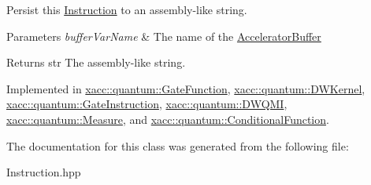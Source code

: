 Persist this \hyperlink{a01155}{Instruction} to an assembly-\/like string.


\begin{DoxyParams}{Parameters}
{\em buffer\+Var\+Name} & The name of the \hyperlink{a01123}{Accelerator\+Buffer} \\
\hline
\end{DoxyParams}
\begin{DoxyReturn}{Returns}
str The assembly-\/like string. 
\end{DoxyReturn}


Implemented in \hyperlink{a01011_aa1950776ae84bad2d0795a0441f910e7}{xacc\+::quantum\+::\+Gate\+Function}, \hyperlink{a00983_adbc3fdd080ebba20bc620b8832979f16}{xacc\+::quantum\+::\+D\+W\+Kernel}, \hyperlink{a01015_a089a5da67ff40ac1a6f56e64589822d9}{xacc\+::quantum\+::\+Gate\+Instruction}, \hyperlink{a00987_a8d8742bb6743cf6e49f95966d05bbec2}{xacc\+::quantum\+::\+D\+W\+Q\+MI}, \hyperlink{a01047_a1c51a5d68294dcb2ba1a9fbea63a730f}{xacc\+::quantum\+::\+Measure}, and \hyperlink{a01035_aca7a5f849fece6fc28a904efee9a3370}{xacc\+::quantum\+::\+Conditional\+Function}.



The documentation for this class was generated from the following file\+:\begin{DoxyCompactItemize}
\item 
Instruction.\+hpp\end{DoxyCompactItemize}
